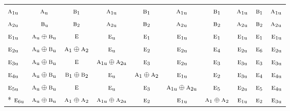 \documentclass[10pt,a4paper]{article}
\numberwithin{equation}{section}
\newcommand{\irr}[1]{\text{\normalfont\scshape #1}}
\newcommand{\ptag}[1]{\mathrm{#1}}
\begin{document}
{\begin{longtable}{@{}lccccccccc@{}}
$\irr{a}_{1\ptag{u}}$ & $\irr{a}_{\ptag{u}}$ & $\irr{b}_{1}$ & $\irr{a}_{1\ptag{u}}$ & $\irr{b}_{1}$ & $\irr{a}_{1\ptag{u}}$ & $\irr{b}_{1}$ & $\irr{a}_{1\ptag{u}}$ & $\irr{b}_{1}$ & $\irr{a}_{1\ptag{u}}$\\
$\irr{a}_{2\ptag{u}}$ & $\irr{b}_{\ptag{u}}$ & $\irr{b}_{2}$ & $\irr{a}_{2\ptag{u}}$ & $\irr{b}_{2}$ & $\irr{a}_{2\ptag{u}}$ & $\irr{b}_{2}$ & $\irr{a}_{2\ptag{u}}$ & $\irr{b}_{2}$ & $\irr{a}_{2\ptag{u}}$\\
$\irr{e}_{1\ptag{u}}$ & $\irr{a}_{\ptag{u}}\oplus \irr{b}_{\ptag{u}}$ & $\irr{e}$ & $\irr{e}_{\ptag{u}}$ & $\irr{e}_{1}$ & $\irr{e}_{1\ptag{u}}$ & $\irr{e}_{1}$ & $\irr{e}_{1\ptag{u}}$ & $\irr{e}_{1}$ & $\irr{e}_{1\ptag{u}}$\\
$\irr{e}_{2\ptag{u}}$ & $\irr{a}_{\ptag{u}}\oplus \irr{b}_{\ptag{u}}$ & $\irr{a}_{1}\oplus \irr{a}_{2}$ & $\irr{e}_{\ptag{u}}$ & $\irr{e}_{2}$ & $\irr{e}_{2\ptag{u}}$ & $\irr{e}_{4}$ & $\irr{e}_{2\ptag{u}}$ & $\irr{e}_{6}$ & $\irr{e}_{2\ptag{u}}$\\
$\irr{e}_{3\ptag{u}}$ & $\irr{a}_{\ptag{u}}\oplus \irr{b}_{\ptag{u}}$ & $\irr{e}$ & $\irr{a}_{1\ptag{u}}\oplus \irr{a}_{2\ptag{u}}$ & $\irr{e}_{3}$ & $\irr{e}_{2\ptag{u}}$ & $\irr{e}_{3}$ & $\irr{e}_{3\ptag{u}}$ & $\irr{e}_{3}$ & $\irr{e}_{3\ptag{u}}$\\
$\irr{e}_{4\ptag{u}}$ & $\irr{a}_{\ptag{u}}\oplus \irr{b}_{\ptag{u}}$ & $\irr{b}_{1}\oplus \irr{b}_{2}$ & $\irr{e}_{\ptag{u}}$ & $\irr{a}_{1}\oplus \irr{a}_{2}$ & $\irr{e}_{1\ptag{u}}$ & $\irr{e}_{2}$ & $\irr{e}_{3\ptag{u}}$ & $\irr{e}_{4}$ & $\irr{e}_{4\ptag{u}}$\\
$\irr{e}_{5\ptag{u}}$ & $\irr{a}_{\ptag{u}}\oplus \irr{b}_{\ptag{u}}$ & $\irr{e}$ & $\irr{e}_{\ptag{u}}$ & $\irr{e}_{3}$ & $\irr{a}_{1\ptag{u}}\oplus \irr{a}_{2\ptag{u}}$ & $\irr{e}_{5}$ & $\irr{e}_{2\ptag{u}}$ & $\irr{e}_{5}$ & $\irr{e}_{4\ptag{u}}$\\*
$\irr{e}_{6\ptag{u}}$ & $\irr{a}_{\ptag{u}}\oplus \irr{b}_{\ptag{u}}$ & $\irr{a}_{1}\oplus \irr{a}_{2}$ & $\irr{a}_{1\ptag{u}}\oplus \irr{a}_{2\ptag{u}}$ & $\irr{e}_{2}$ & $\irr{e}_{1\ptag{u}}$ & $\irr{a}_{1}\oplus \irr{a}_{2}$ & $\irr{e}_{1\ptag{u}}$ & $\irr{e}_{2}$ & $\irr{e}_{3\ptag{u}}$\\
\bottomrule\end{longtable}}
\end{document}
